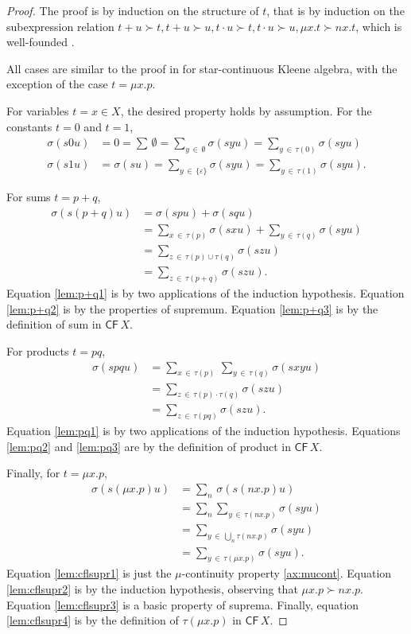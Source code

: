 \documentclass[copyright,creativecommons]{eptcs}
\theoremstyle{remark}
\newcommand\eps\varepsilon
\newcommand\mathname[1]{\ensuremath{\mathsf{#1}}}
\newcommand\cset[1]{\{#1\}}
\newcommand\CFname{\mathname{CF}}
\newcommand\CF[1]{\CFname\,#1}
\begin{document}
\begin{proof}
The proof is by induction on the structure of $t$, that is by
induction on the subexpression relation $t + u \succ t, t + u \succ u,
t \cdot u \succ t, t \cdot u \succ u, \mu x. t \succ n x. t$, which is 
well-founded \cite{kozen83}.

All cases are similar to the proof in \cite[Lemma 7.1]{K91a} for star-continuous Kleene algebra, with the exception of the case $t=\mu x.p$.

For variables $t=x\in X$, the desired property holds by assumption. For the constants $t=0$ and $t=1$,
\begin{align*}
\sigma(s0u) &= 0 = \sum\,\emptyset = \sum_{y\,\in\,\emptyset} \sigma(syu) = \sum_{y\,\in\,\tau(0)} \sigma(syu)\\
\sigma(s1u) &= \sigma(su) = \sum_{y\,\in\,\cset\eps} \sigma(syu) = \sum_{y\,\in\,\tau(1)} \sigma(syu).
\end{align*}

For sums $t=p+q$,
\begin{align}
\sigma(s(p+q)u) &= \sigma(spu) + \sigma(squ)\nonumber\\
&= \sum_{x\,\in\,\tau(p)} \sigma(sxu) + \sum_{y\,\in\,\tau(q)} \sigma(syu)\label{lem:p+q1}\\
&= \sum_{z\,\in\,\tau(p)\cup\tau(q)} \sigma(szu)\label{lem:p+q2}\\
&= \sum_{z\,\in\,\tau(p+q)} \sigma(szu)\label{lem:p+q3}.
\end{align}
Equation \eqref{lem:p+q1} is by two applications of the induction hypothesis.
Equation \eqref{lem:p+q2} is by the properties of supremum. 
Equation \eqref{lem:p+q3} is by the definition of sum in $\CF X$. 

For products $t=pq$,
\begin{align}
\sigma(spqu) &= \sum_{x\,\in\,\tau(p)}\,\sum_{y\,\in\,\tau(q)} \sigma(sxyu)\label{lem:pq1}\\
&= \sum_{z\,\in\,\tau(p)\cdot\tau(q)} \sigma(szu)\label{lem:pq2}\\
&= \sum_{z\,\in\,\tau(pq)} \sigma(szu)\label{lem:pq3}.
\end{align}
Equation \eqref{lem:pq1} is by two applications of the induction hypothesis.
Equations \eqref{lem:pq2} and \eqref{lem:pq3} are by the definition of product in $\CF X$. 

Finally, for $t=\mu x.p$,
\begin{align}
\sigma(s(\mu x.p)u) &= \sum_n\,\sigma(s(nx.p)u)\label{lem:cflsupr1}\\
&= \sum_n \sum_{y\,\in\,\tau(nx.p)} \sigma(syu)\label{lem:cflsupr2}\\
&= \sum_{y\,\in\,\bigcup_n\!\tau(nx.p)} \sigma(syu)\label{lem:cflsupr3}\\
&= \sum_{y\,\in\,\tau(\mu x.p)} \sigma(syu).\label{lem:cflsupr4}
\end{align}
Equation \eqref{lem:cflsupr1} is just the $\mu$-continuity property \eqref{ax:mucont}.
Equation \eqref{lem:cflsupr2} is by the induction hypothesis, observing that $\mu x. p \succ nx.p$. 
Equation \eqref{lem:cflsupr3} is a basic property of suprema. 
Finally, equation \eqref{lem:cflsupr4} is by the definition of $\tau(\mu x.p)$ in $\CF X$.


\end{proof}
\end{document}
